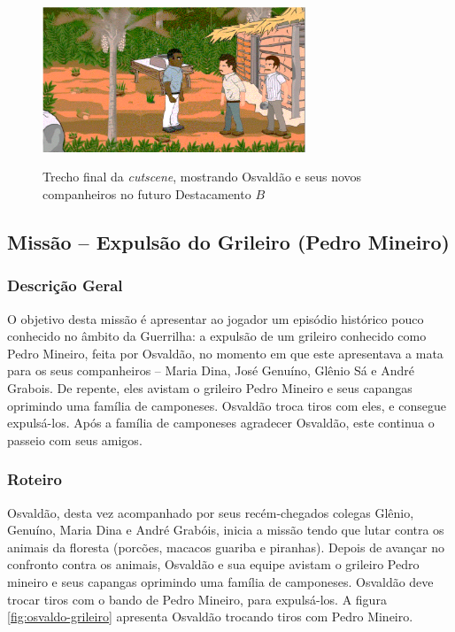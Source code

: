 \begin{figure}[H]
	\centering
	\caption{Trecho final da \textit{cutscene}, mostrando Osvaldão e seus novos companheiros no futuro Destacamento $B$}
	\includegraphics[width=0.7\textwidth]{figuras/cutscene1_fase1.png}
	\label{fig:cutscene1-fase1}
	{}
\end{figure}

\subsection{Missão -- Expulsão do Grileiro (Pedro Mineiro)}
\label{missao:expgrileiro}

\subsubsection{Descrição Geral}

O objetivo desta missão é apresentar ao jogador um episódio histórico pouco conhecido no âmbito da Guerrilha: a expulsão de um grileiro conhecido como Pedro Mineiro, feita por Osvaldão, no momento em que este apresentava a mata para os seus companheiros -- Maria Dina, José Genuíno, Glênio Sá e André Grabois. De repente, eles avistam o grileiro Pedro Mineiro e seus capangas oprimindo uma família de camponeses. Osvaldão troca tiros com eles, e consegue expulsá-los. Após a família de camponeses agradecer Osvaldão, este continua o passeio com seus amigos.

\subsubsection{Roteiro}

Osvaldão, desta vez acompanhado por seus recém-chegados colegas Glênio, Genuíno, Maria Dina e André Grabóis, inicia a missão tendo que lutar contra os animais da floresta (porcões, macacos guariba e piranhas). Depois de avançar no confronto contra os animais, Osvaldão e sua equipe avistam o grileiro Pedro mineiro e seus capangas oprimindo uma família de camponeses. Osvaldão deve trocar tiros com o bando de Pedro Mineiro, para expulsá-los. A figura \ref{fig:osvaldo-grileiro} apresenta Osvaldão trocando tiros com Pedro Mineiro.

